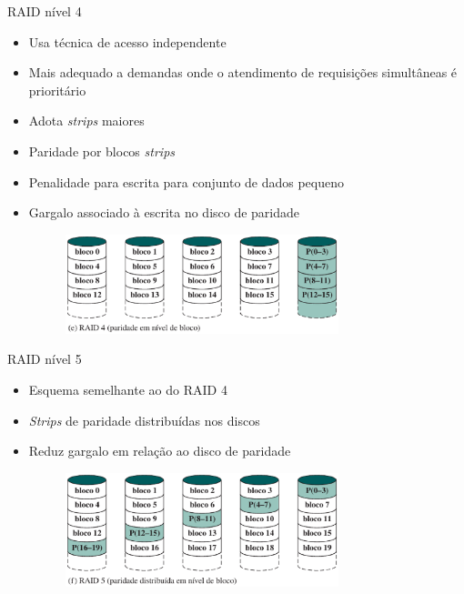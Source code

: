 \begin{slide}{RAID nível 4}
	\begin{itemize}
		\item Usa técnica de acesso independente
		\item Mais adequado a demandas onde o atendimento de requisições simultâneas é prioritário
		\item Adota \emph{strips} maiores
		\item Paridade por blocos \emph{strips}
		\item Penalidade para escrita para conjunto de dados pequeno
		\item Gargalo associado à escrita no disco de paridade
			\begin{figure}[h]
				\centering
				\includegraphics[width=0.75\textwidth]{figs/raid4}
			\end{figure}
	\end{itemize}
\end{slide}

\begin{slide}{RAID nível 5}
	\begin{itemize}
		\item Esquema semelhante ao do RAID 4
		\item \emph{Strips} de paridade distribuídas nos discos
		\item Reduz gargalo em relação ao disco de paridade
			\begin{figure}[h]
				\centering
				\includegraphics[width=0.75\textwidth]{figs/raid5}
			\end{figure}
	\end{itemize}
\end{slide}

